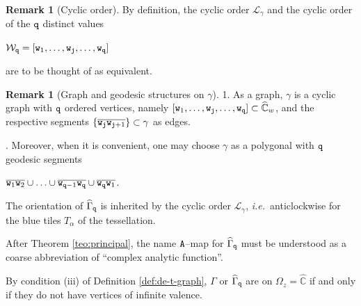 \documentclass[final,3p,times]{elsarticle}
\newcommand{\CW}{\ensuremath{{\widehat{\mathbb C}}}}
\theoremstyle{definition}
\newtheorem{remark}[theorem]{Remark}
\begin{document}
\begin{remark}[Cyclic order]
By definition, the cyclic order $\mathcal{L}_\gamma$ 
and the cyclic order of the $\tt q$ distinct values 

\centerline{$\mathcal{W}_{\tt q}=[ {\tt w}_{1}, \ldots, {\tt w}_{\tt j}, \ldots, {\tt w}_{\tt q} ] $}

\noindent
are to be thought of as equivalent.
\end{remark}


\begin{remark}[Graph and geodesic structures on $\gamma$]
\label{rem:gamma-poligonal-y-grafica}
1. 
As a graph, $\gamma$ is a cyclic graph with ${\tt q}$ ordered vertices,
namely 
$[{\tt w}_{1}, \ldots, {\tt w}_{\tt j}, \ldots, 
{\tt w}_{\tt q} ] \subset\CW_w$, 
and the respective segments 
$\{ \overline{{\tt w}_{\tt j} {\tt w}_{{\tt j}+1}} \} \subset \gamma $
as edges. 

.
Moreover, 
when it is convenient, one may choose
$\gamma$ as a polygonal with ${\tt q}$
geodesic segments 

\centerline{ 
$\overline {{\tt w}_1 {\tt w}_2 } \cup
\ldots \cup
\overline {{\tt w}_{{\tt q}-1} {\tt w}_{\tt q} } \cup
\overline {{\tt w}_{\tt q} {\tt w}_1 }
$.}
\end{remark}

The orientation of $\widehat{\Gamma}_{\tt q}$ is 
inherited by the cyclic order $\mathcal{L}_\gamma$, \emph{i.e.}\ anticlockwise
for the blue tiles $T_\alpha$ of the tessellation.

After Theorem \ref{teo:principal}, the
name ${\tt A}$--map for $\widehat{\Gamma}_{\tt q}$ 
must be understood as a 
coarse abbreviation of
``complex analytic function''.

By condition (iii) of Definition \ref{def:de-t-graph}, 
$\Gamma$ or $\widehat{\Gamma}_{\tt q}$ are on 
$\Omega_z=\CW$ if and only if  
they do not have vertices of infinite valence.
\end{document}
